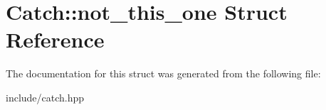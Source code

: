 \hypertarget{structCatch_1_1not__this__one}{}\section{Catch\+:\+:not\+\_\+this\+\_\+one Struct Reference}
\label{structCatch_1_1not__this__one}


The documentation for this struct was generated from the following file\+:\begin{DoxyCompactItemize}
\item 
include/catch.\+hpp\end{DoxyCompactItemize}
